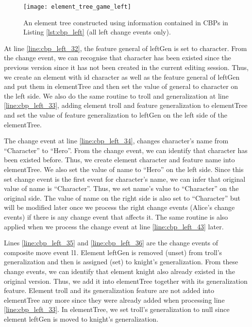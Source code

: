\begin{figure}[ht]
  \centering
  \texttt{[image: element\_tree\_game\_left]}
  \caption{An element tree constructed using information contained in CBPs in Listing \ref{lst:cbp_left} (all left change events only).}
  \label{fig:left_element_tree_diagram}
\end{figure} 

At line \ref{line:cbp_left_32}, the feature \textsf{general} of \textsf{leftGen} is set to \textsf{character}. From the change event, we can recognise that \textsf{character} has been existed since the previous version since it has not been created in the current editing session. Thus, we create an element with id \textsf{character} as well as the feature \textsf{general} of \textsf{leftGen} and put them in \textsf{elementTree} and then set the value of \textsf{general} to \textsf{character} on the left side. We also do the same routine to \textsf{troll} and \textsf{generalization} at line \ref{line:cbp_left_33}, adding element \textsf{troll} and feature \textsf{generalization} to \textsf{elementTree} and set the value of feature \textsf{generalization} to \textsf{leftGen} on the left side of the \textsf{elementTree}. 

The change event at line \ref{line:cbp_left_34}, changes \textsf{character}'s \textsf{name} from ``Character'' to ``Hero''. From the change event, we can identify that \textsf{character} has been existed before. Thus, we create element \textsf{character} and feature \textsf{name} into \textsf{elementTree}. We also set the value of \textsf{name} to ``Hero'' on the left side. Since this set change event is the first event for \textsf{character}'s \textsf{name}, we can infer that original value of \textsf{name} is ``Character''. Thus, we set \textsf{name}'s value to ``Character'' on the original side. The value of \textsf{name} on the right side is also set to ``Character'' but will be modified later once we process the right change events (Alice's change events) if there is any change event that affects it. The same routine is also applied when we process the change event at line \ref{line:cbp_left_43} later.

Lines \ref{line:cbp_left_35} and \ref{line:cbp_left_36} are the change events of  composite move event \textsf{l1}. Element \textsf{leftGen} is removed (unset) from \textsf{troll}'s \textsf{generalization} and then is assigned (set) to \textsf{knight}'s \textsf{generalization}. From these change events, we can identify that element \textsf{knight} also already existed in the original version. Thus, we add it into \textsf{elementTree} together with its  \textsf{generalization} feature. Element \textsf{troll} and its  \textsf{generalization} feature are not added into \textsf{elementTree} any more since they were already added when processing line \ref{line:cbp_left_33}. In \textsf{elementTree}, we set \textsf{troll}'s \textsf{generalization} to null since element \textsf{leftGen} is moved to \textsf{knight}'s \textsf{generalization}.


